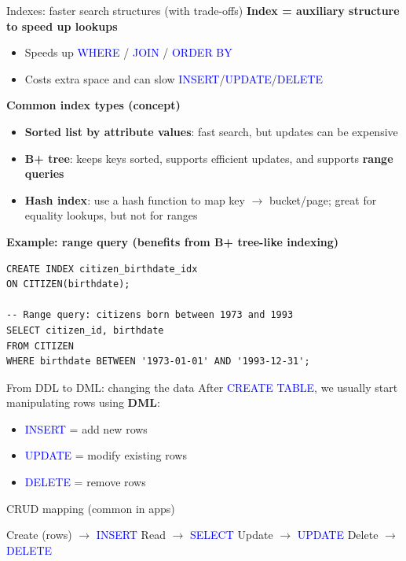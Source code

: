 \documentclass[10pt,aspectratio=169]{beamer}
\newcommand{\sqlk}[1]{\textcolor{blue}{#1}}
\begin{document}
\begin{frame}[fragile]{Indexes: faster search structures (with trade-offs)}
\small
\textbf{Index = auxiliary structure to speed up lookups}
\begin{itemize}
  \item Speeds up \sqlk{WHERE} / \sqlk{JOIN} / \sqlk{ORDER BY}
  \item Costs extra space and can slow \sqlk{INSERT}/\sqlk{UPDATE}/\sqlk{DELETE}
\end{itemize}

\vspace{1mm}
\textbf{Common index types (concept)}
\begin{itemize}
  \item \textbf{Sorted list by attribute values}: fast search, but updates can be expensive
  \item \textbf{B+ tree}: keeps keys sorted, supports efficient updates, and supports \textbf{range queries}
  \item \textbf{Hash index}: use a hash function to map key $\rightarrow$ bucket/page; great for equality lookups,
        but not for ranges
\end{itemize}

\vspace{-2mm}
\textbf{Example: range query (benefits from B+ tree-like indexing)}
\begin{lstlisting}[style=sqlite,basicstyle=\scriptsize\ttfamily]
CREATE INDEX citizen_birthdate_idx
ON CITIZEN(birthdate);

-- Range query: citizens born between 1973 and 1993
SELECT citizen_id, birthdate
FROM CITIZEN
WHERE birthdate BETWEEN '1973-01-01' AND '1993-12-31';
\end{lstlisting}
\end{frame}


\begin{frame}{From DDL to DML: changing the data}
\small
After \sqlk{CREATE TABLE}, we usually start manipulating rows using \textbf{DML}:
\vspace{1mm}
\begin{itemize}
  \item \sqlk{INSERT} = add new rows
  \item \sqlk{UPDATE} = modify existing rows
  \item \sqlk{DELETE} = remove rows
\end{itemize}
\vspace{1mm}
\begin{block}{CRUD mapping (common in apps)}
\medskip

\footnotesize
Create (rows) $\rightarrow$ \sqlk{INSERT}\quad
Read $\rightarrow$ \sqlk{SELECT}\quad
Update $\rightarrow$ \sqlk{UPDATE}\quad
Delete $\rightarrow$ \sqlk{DELETE}
\end{block}
\end{frame}
\end{document}
